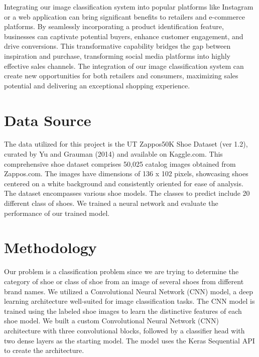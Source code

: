 \documentclass[11pt,a4paper]{article}
\begin{document}
\noindent
Integrating our image classification system into popular platforms like Instagram or a web application can bring significant benefits to retailers and e-commerce platforms. By seamlessly incorporating a product identification feature, businesses can captivate potential buyers, enhance customer engagement, and drive conversions. This transformative capability bridges the gap between inspiration and purchase, transforming social media platforms into highly effective sales channels. The integration of our image classification system can create new opportunities for both retailers and consumers, maximizing sales potential and delivering an exceptional shopping experience. 
	
\section{Data Source} 
The data utilized for this project is the UT Zappos50K Shoe Dataset (ver 1.2), curated by Yu and Grauman (2014) and available on Kaggle.com. This comprehensive shoe dataset comprises 50,025 catalog images obtained from Zappos.com. The images have dimensions of 136 x 102 pixels, showcasing shoes centered on a white background and consistently oriented for ease of analysis. The dataset encompasses various shoe models. The classes to predict include 20 different class of shoes. We trained a neural network and evaluate the performance of our trained model.  
		
\section{Methodology} 
Our problem is a classification problem since we are trying to determine the category of shoe or class of shoe from an image of several shoes from different brand names. We utilized a Convolutional Neural Network (CNN) model, a deep learning architecture well-suited for image classification tasks. The CNN model is trained using the labeled shoe images to learn the distinctive features of each shoe model. We built a custom Convolutional Neural Network (CNN) architecture with three convolutional blocks, followed by a classifier head with two dense layers as the starting model. The model uses the Keras Sequential API to create the architecture.
\end{document}

